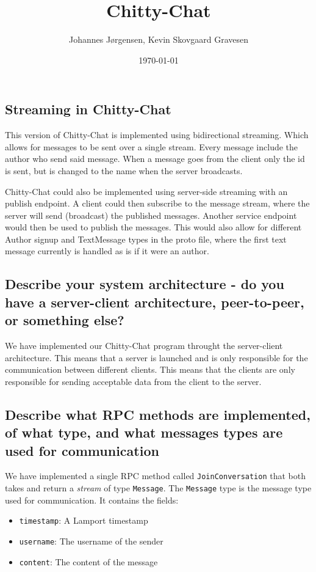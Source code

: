 \documentclass[a4paper,11pt]{article}
\title{Chitty-Chat}
\author{Johannes Jørgensen, Kevin Skovgaard Gravesen}
\date{\today}
\begin{document}
 

\maketitle

\subsection*{Streaming in Chitty-Chat}
This version of Chitty-Chat is implemented using bidirectional streaming. Which allows for messages to be sent over a single stream.
Every message include the author who send said message. When a message goes from the client only the id is sent, but is changed to the name when the server broadcasts.

Chitty-Chat could also be implemented using server-side streaming with an publish endpoint.
A client could then subscribe to the message stream, where the server will send (broadcast) the published messages.
Another service endpoint would then be used to publish the messages.
This would also allow for different Author signup and TextMessage types in the proto file, where the first text message currently is handled as is if it were an author.

\subsection*{Describe your system architecture - do you have a server-client architecture, peer-to-peer, or something else?}
We have implemented our Chitty-Chat program throught the server-client architecture. 
This means that a server is launched and is only responsible for the communication between different clients. This means that the clients are only responsible for
sending acceptable data from the client to the server.

\subsection*{Describe what  RPC methods are implemented, of what type, and what messages types are used for communication}
We have implemented a single RPC method called \verb|JoinConversation| that both takes and return a \textit{stream} of type \verb|Message|.
The \verb|Message| type is the message type used for communication. It contains the fields:
\begin{itemize}
    \item \verb|timestamp|: A Lamport timestamp
    \item \verb|username|: The username of the sender
    \item \verb|content|: The content of the message
\end{itemize} 
\end{document}
